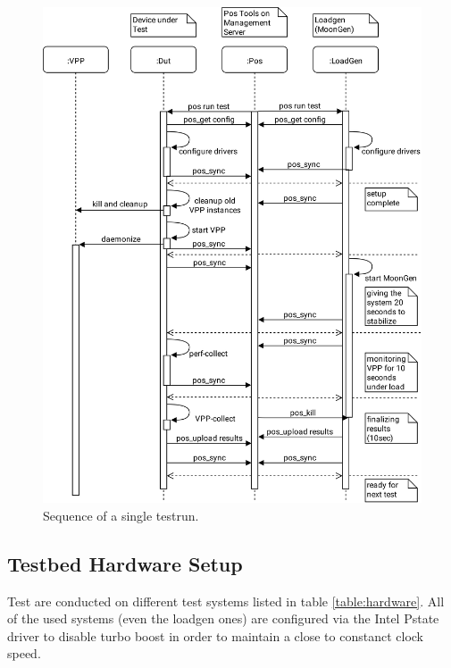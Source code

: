 \begin{figure}[!ht]
\noindent\hspace{0.5mm}\includegraphics[width=\linewidth]{pics/procedure-sequence.png}
\caption{Sequence of a single testrun. }
\label{testsequence}
\end{figure}


\subsection{Testbed Hardware Setup}
\label{sec:hardware}

Test are conducted on different test systems listed in table \ref{table:hardware}. All of the used systems (even the \Ac{loadgen} ones) are configured via the Intel Pstate driver to disable turbo boost in order to maintain a close to constanct clock speed. 


